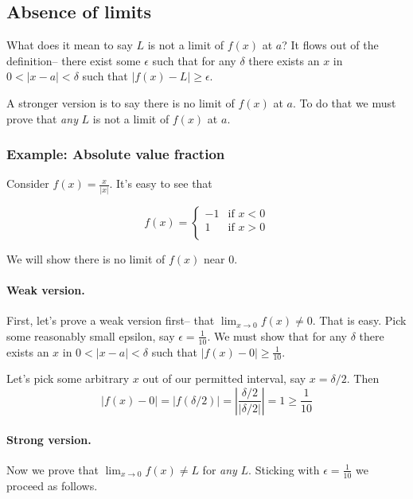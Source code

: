 \subsection{Absence of limits}

What does it mean to say $L$ is not a limit of $f(x)$ at $a$? It flows
out of the definition-- there exist some $\epsilon$ such that for any
$\delta$ there exists an $x$ in $0<|x-a|<\delta$ such that $|f(x)-L|\geq\epsilon$.

\vs

A stronger version is to say there is no limit of $f(x)$ at $a$. To do
that we must prove that \textit{any} $L$ is not a limit of $f(x)$ at
$a$.

\subsubsection*{Example: Absolute value fraction}

Consider $f(x)=\frac{x}{|x|}$. It's easy to see that

\[f(x)=\begin{cases}
    -1 & \text{if } x<0\\
    1 & \text{if } x>0\\
\end{cases}\]

We will show there is no limit of $f(x)$ near $0$.

\paragraph{Weak version.}

First, let's prove a weak version first-- that
$\lim_{x\to 0}f(x)\neq 0$. That is easy. Pick some reasonably small
epsilon, say $\epsilon=\frac{1}{10}$. We must show that for any
$\delta$ there exists an $x$ in $0<|x-a|<\delta$ such that
$|f(x)-0|\geq \frac{1}{10}$.

\vs

Let's pick some arbitrary $x$ out of our permitted interval, say $x=\delta/2$. Then
\[|f(x)-0|=|f(\delta/2)|=\left|\frac{\delta/2}{|\delta/2|}\right|=1\geq\frac{1}{10}\]


\paragraph{Strong version.}

Now we prove that $\lim_{x\to 0}f(x)\neq L$ for \textit{any} $L$. Sticking
with $\epsilon=\frac{1}{10}$ we proceed as follows.

